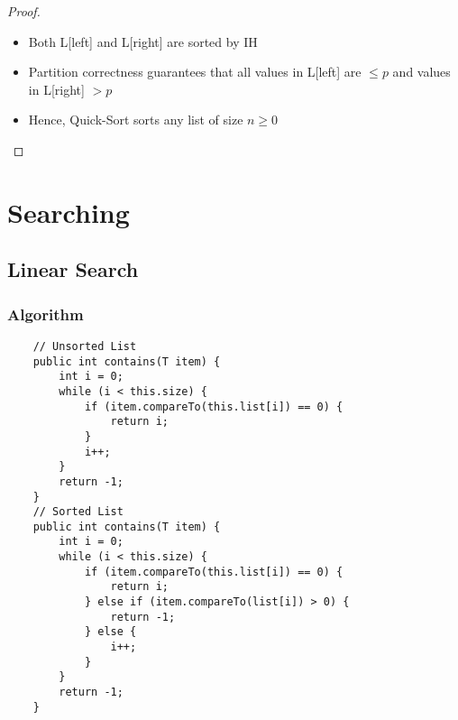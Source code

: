 \documentclass[10pt, 
a4paper, 
oneside, 
headinclude, footinclude, 
BCOR5mm]
{scrartcl}
\begin{document}
\begin{definition}
\begin{itemize}
\begin{itemize}
\begin{proof}
\begin{itemize}
\begin{itemize}
                        \item Both L[left] and L[right] are sorted by IH
                        \item Partition correctness guarantees that all values in L[left] are $\leq p$ and values in L[right] $>p$
                        \item Hence, Quick-Sort sorts any list of size $n\geq 0$
                    \end{itemize} 
                \end{itemize}
            \end{proof}
        \end{itemize}
    \end{itemize}
\end{definition}
\newpage
\section{Searching}
\subsection{Linear Search}
\subsubsection{Algorithm}
\begin{lstlisting}
    // Unsorted List
    public int contains(T item) {
        int i = 0;
        while (i < this.size) {
            if (item.compareTo(this.list[i]) == 0) {
                return i;
            }
            i++;
        }
        return -1;
    }
    // Sorted List
    public int contains(T item) {
        int i = 0;
        while (i < this.size) {
            if (item.compareTo(this.list[i]) == 0) {
                return i;
            } else if (item.compareTo(list[i]) > 0) {
                return -1;
            } else {
                i++;
            }
        }
        return -1;
    }
\end{lstlisting}
\end{document}
